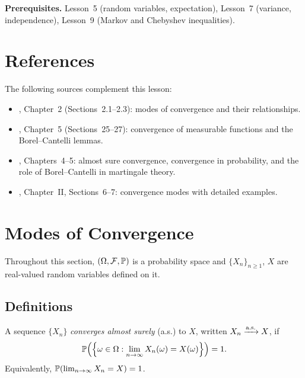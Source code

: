 \documentclass[11pt,a4paper]{article}
\begin{document}
\medskip
\noindent\textbf{Prerequisites.}
Lesson~5 (random variables, expectation), Lesson~7 (variance,
independence), Lesson~9 (Markov and Chebyshev inequalities).


\section{References}
\label{sec:references}

The following sources complement this lesson:
\begin{itemize}[nosep]
  \item \citet{durrett2019}, Chapter~2 (Sections~2.1--2.3):
    modes of convergence and their relationships.
  \item \citet{billingsley1995}, Chapter~5 (Sections~25--27):
    convergence of measurable functions and the Borel--Cantelli
    lemmas.
  \item \citet{williams1991}, Chapters~4--5: almost sure
    convergence, convergence in probability, and the role of
    Borel--Cantelli in martingale theory.
  \item \citet{shiryaev2016}, Chapter~II, Sections~6--7:
    convergence modes with detailed examples.
\end{itemize}


\section{Modes of Convergence}
\label{sec:convergence}

Throughout this section, $(\Omega, \mathcal{F}, \mathbb{P})$ is a
probability space and $\{X_n\}_{n \geq 1}$, $X$ are real-valued
random variables defined on it.

\subsection{Definitions}
\label{subsec:conv_def}

\begin{definition}
\label{def:as_conv}
A sequence $\{X_n\}$ \emph{converges almost surely} (a.s.) to $X$,
written $X_n \xrightarrow{\text{a.s.}} X$, if
\begin{equation}
  \mathbb{P}\!\left(\left\{\omega \in \Omega :
    \lim_{n \to \infty} X_n(\omega) = X(\omega)
    \right\}\right) = 1.
  \label{eq:as_conv}
\end{equation}
Equivalently, $\mathbb{P}(\lim_{n \to \infty} X_n = X) = 1$.
\end{definition}
\end{document}
